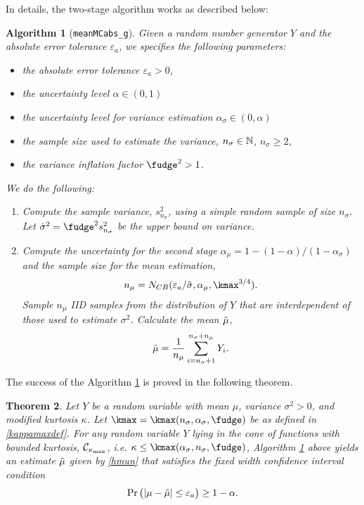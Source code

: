 \documentclass{iitthesis}
\newtheorem{theorem}{Theorem}[section]
\newtheorem{algorithm}[theorem]{Algorithm}
\begin{document}
In details, the two-stage algorithm works as described below:
\begin{algorithm}[{\tt meanMCabs\_g}]\label{meanMCabsg}
Given a random number generator $Y$ and the absolute error tolerance $\varepsilon_a$, we specifies the following parameters:
\begin{itemize}
\item the absolute error tolerance $\varepsilon_a >0$,
\item the uncertainty level $\alpha \in (0,1)$
\item the uncertainty level for variance estimation $\alpha_\sigma \in (0,\alpha)$
\item the sample size used to estimate the variance, $n_{\sigma} \in \mathbb{N}$, $n_{\sigma} \geq 2$,
\item the variance inflation factor $\fudge^2 >1$.
\end{itemize}
We do the following:
\begin{enumerate}
\item Compute the sample variance, $s^2_{n_{\sigma}}$, using a simple random sample of size $n_\sigma$. Let $\hsigma^2 = \fudge^2 s^2_{n_\sigma}$ be the upper bound on variance.
\item Compute the uncertainty for the second stage $\alpha_\mu = 1-(1-\alpha)/(1-\alpha_{\sigma})$ and the sample size for the mean estimation,
\begin{align}\label{NCBmeanMCabs}
n_\mu = N_{CB} (\varepsilon_a/\hsigma,\alpha_\mu, \kmax^{3/4}).
\end{align}
Sample $n_\mu$ IID samples from the distribution of $Y$ that are interdependent of those used to estimate $\sigma^2$. Calculate the mean $\tilde{\mu}$,
\begin{align}\label{hmun}
\tilde{\mu} = \frac{1}{n_\mu}\sum_{i = n_\sigma+1}^{n_\sigma+n_\mu}Y_i.
\end{align}
\end{enumerate}
\end{algorithm}
The success of the Algorithm \ref{meanMCabsg} is proved in the following theorem.
\begin{theorem}
Let $Y$ be a random variable with mean $\mu$, variance $\sigma^2 >0$, and modified kurtosis $\kappa$. Let $\kmax=\kmax(n_\sigma,\alpha_\sigma,\fudge)$ be as defined in \eqref{kappamaxdef}. For any random variable $Y$ lying in the cone of functions with bounded kurtosis, $\mathcal{C}_{\kappa_{\max}}$, i.e.
$\kappa\leq\kmax(\alpha_{\sigma},n_{\sigma},\fudge)$, Algorithm \ref{meanMCabsg} above yields an estimate $\tilde{\mu}$ given by \eqref{hmun} that satisfies the fixed width confidence interval condition
\begin{align}
\Pr\left( \left \lvert \mu-\tilde{\mu} \right \rvert \leq \varepsilon_a \right) \geq 1-\alpha.
\end{align}
\end{theorem}
\end{document}
